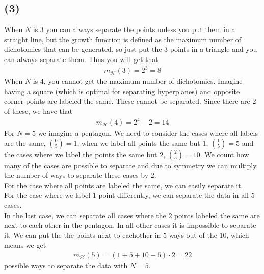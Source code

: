 \documentclass[a4paper]{article}
\begin{document}
\subsection*{(3)}
When $N$ is $3$ you can always separate the points unless you put them in a straight line, but the growth function is defined as the maximum number of dichotomies that can be generated, so just put the $3$ points in a triangle and you can always separate them. Thus you will get that
\begin{align*}
m_\mathcal{H}(3) = 2^3 = 8
\end{align*}
When $N$ is $4$, you cannot get the maximum number of dichotomies. Imagine having a square (which is optimal for separating hyperplanes) and opposite corner points are labeled the same. These cannot be separated. Since there are $2$ of these, we have that
\begin{align*}
m_\mathcal{H}(4) = 2^4-2 = 14
\end{align*}
For $N=5$ we imagine a pentagon. We need to consider the cases where all labels are the same, $\binom {0} {5}=1$, when we label all points the same but $1$, $\binom {1} {5}=5$ and the cases where we label the points the same but $2$, $\binom {2} {5}=10$. We count how many of the cases are possible to separate and due to symmetry we can multiply the number of ways to separate these cases by $2$.\\
For the case where all points are labeled the same, we can easily separate it.\\
For the case where we label $1$ point differently, we can separate the data in all $5$ cases. \\
In the last case, we can separate all cases where the $2$ points labeled the same are next to each other in the pentagon. In all other cases it is impossible to separate it. We can put the the points next to eachother in $5$ ways out of the $10$, which means we get
\begin{align*}
m_\mathcal{H}(5) = (1+5+10-5)\cdot 2 = 22
\end{align*}
possible ways to separate the data with $N=5$.
\end{document}
